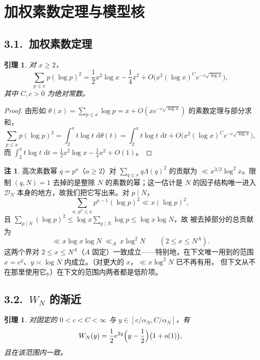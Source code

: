 \documentclass[12pt,a4paper]{amsart}
\numberwithin{equation}{section}
\theoremstyle{plain}
\newtheorem{lemma}[theorem]{引理}
\theoremstyle{definition}
\newtheorem{remark}[theorem]{注}
\newcommand{\dd}{\,\mathrm{d}}
\begin{document}
\section{加权素数定理与模型核}\label{sec:pnt}

\subsection*{3.1.\ 加权素数定理}

\begin{lemma}\label{lem:pnt}
对 $x\ge2$，
\begin{equation}\label{eq:pnt}
 \sum_{p\le x}p(\log p)^2
 =\frac12x^2\log x-\frac14x^2+O\bigl(x^2(\log x)^Ce^{-c\sqrt{\log x}}\bigr),
\end{equation}
其中 $C,c>0$ 为绝对常数。
\end{lemma}

\begin{proof}
由形如
$\theta(x)=\sum_{p\le x}\log p=x+O(xe^{-c\sqrt{\log x}})$ 的素数定理与部分求和，
\[
 \sum_{p\le x}p(\log p)^2=\int_2^x t\log t\,\dd\theta(t)
 =\int_2^x t\log t\,\dd t+O\bigl(x^2(\log x)^Ce^{-c\sqrt{\log x}}\bigr),
\]
而 $\int_2^x t\log t\,\dd t=\frac12x^2\log x-\frac14x^2+O(1)$。
\end{proof}

\begin{remark}\label{rem:primepowers}
高次素数幂 $q=p^a$（$a\ge2$）对 $\sum_{q\le x}q\Lambda(q)^2$ 的贡献为
$\ll x^{3/2}\log^2x$。限制 $(q,N)=1$ 去掉的是整除 $N$ 的素数的幂；这一估计是
$N$ 的因子结构唯一进入 $\mathcal D_N$ 本身的地方，故我们把它写出来。对 $p\mid N$，
\[
 \sum_{a:\,p^a\le x}p^{a-1}(\log p)^2\ll x(\log p)^2 ,
\]
且 $\sum_{p\mid N}(\log p)^2\le\log x\sum_{p\mid N}\log p\le\log x\log N$，故
被去掉部分的总贡献为
\[
 \ll x\log x\log N\ \ll_A\ x\log^2N\qquad(2\le x\le N^A).
\]
这两个界对 $2\le x\le N^{A}$（$A$ 固定）一致成立——特别地，在下文唯一用到的范围
$x=e^y$、$y\asymp\log N$ 内成立。（对更大的 $x$，$\ll x\log^2N$ 已不再有用，
但下文从不在那里使用它。）在下文的范围内两者都是低阶项。
\end{remark}

\subsection*{3.2.\ $W_N$ 的渐近}

\begin{lemma}\label{lem:W}
对固定的 $0<c<C<\infty$ 与 $y\in[c/\alpha_N,C/\alpha_N]$，有
\begin{equation}\label{eq:W}
 W_N(y)=\frac12e^{2y}\Bigl(y-\frac12\Bigr)\bigl(1+o(1)\bigr),
\end{equation}
且在该范围内一致。
\end{lemma}
\end{document}
